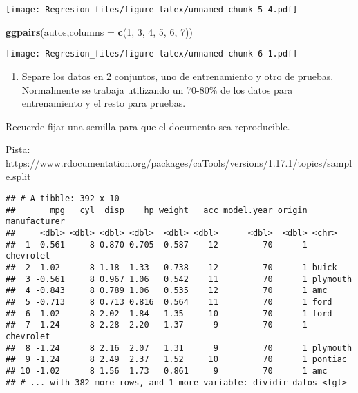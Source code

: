\documentclass[]{article}
\newenvironment{Shaded}{\begin{snugshade}}{\end{snugshade}}
\newcommand{\KeywordTok}[1]{\textcolor[rgb]{0.13,0.29,0.53}{\textbf{{#1}}}}
\newcommand{\DataTypeTok}[1]{\textcolor[rgb]{0.13,0.29,0.53}{{#1}}}
\newcommand{\DecValTok}[1]{\textcolor[rgb]{0.00,0.00,0.81}{{#1}}}
\newcommand{\FloatTok}[1]{\textcolor[rgb]{0.00,0.00,0.81}{{#1}}}
\newcommand{\StringTok}[1]{\textcolor[rgb]{0.31,0.60,0.02}{{#1}}}
\newcommand{\CommentTok}[1]{\textcolor[rgb]{0.56,0.35,0.01}{\textit{{#1}}}}
\newcommand{\NormalTok}[1]{{#1}}
\providecommand{\tightlist}{%
  \setlength{\itemsep}{0pt}\setlength{\parskip}{0pt}}
\begin{document}
\texttt{[image: Regresion\_files/figure-latex/unnamed-chunk-5-4.pdf]}

\begin{Shaded}
\begin{Highlighting}[]
\KeywordTok{ggpairs}\NormalTok{(autos,}\DataTypeTok{columns =} \KeywordTok{c}\NormalTok{(}\DecValTok{1}\NormalTok{, }\DecValTok{3}\NormalTok{, }\DecValTok{4}\NormalTok{, }\DecValTok{5}\NormalTok{, }\DecValTok{6}\NormalTok{, }\DecValTok{7}\NormalTok{))}
\end{Highlighting}
\end{Shaded}

\texttt{[image: Regresion\_files/figure-latex/unnamed-chunk-6-1.pdf]}

\begin{enumerate}
\def\labelenumi{\arabic{enumi}.}
\setcounter{enumi}{2}
\tightlist
\item
  Separe los datos en 2 conjuntos, uno de entrenamiento y otro de
  pruebas. Normalmente se trabaja utilizando un 70-80\% de los datos
  para entrenamiento y el resto para pruebas.
\end{enumerate}

Recuerde fijar una semilla para que el documento sea reproducible.

Pista:
\url{https://www.rdocumentation.org/packages/caTools/versions/1.17.1/topics/sample.split}

\begin{Shaded}
\end{Shaded}

\begin{verbatim}
## # A tibble: 392 x 10
##       mpg   cyl  disp    hp weight   acc model.year origin manufacturer
##     <dbl> <dbl> <dbl> <dbl>  <dbl> <dbl>      <dbl>  <dbl> <chr>       
##  1 -0.561     8 0.870 0.705  0.587    12         70      1 chevrolet   
##  2 -1.02      8 1.18  1.33   0.738    12         70      1 buick       
##  3 -0.561     8 0.967 1.06   0.542    11         70      1 plymouth    
##  4 -0.843     8 0.789 1.06   0.535    12         70      1 amc         
##  5 -0.713     8 0.713 0.816  0.564    11         70      1 ford        
##  6 -1.02      8 2.02  1.84   1.35     10         70      1 ford        
##  7 -1.24      8 2.28  2.20   1.37      9         70      1 chevrolet   
##  8 -1.24      8 2.16  2.07   1.31      9         70      1 plymouth    
##  9 -1.24      8 2.49  2.37   1.52     10         70      1 pontiac     
## 10 -1.02      8 1.56  1.73   0.861     9         70      1 amc         
## # ... with 382 more rows, and 1 more variable: dividir_datos <lgl>
\end{verbatim}
\end{document}
